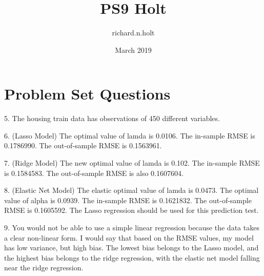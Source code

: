 \documentclass{article}
\title{PS9 Holt}
\author{richard.n.holt }
\date{March 2019}
\begin{document}
\maketitle

\section{Problem Set Questions}

5. The housing train data has observations of 450 different variables.

6. (Lasso Model) The optimal value of lamda is 0.0106. The in-sample RMSE is 0.1786990. The out-of-sample RMSE is 0.1563961.

7. (Ridge Model) The new optimal value of lamda is 0.102. The in-sample RMSE is 0.1584583. The out-of-sample RMSE is also 0.1607604.

8. (Elastic Net Model) The elastic optimal value of lamda is 0.0473. The optimal value of alpha is 0.0939. The in-sample RMSE is 0.1621832. The out-of-sample RMSE is 0.1605592. The Lasso regression should be used for this prediction test.

9. You would not be able to use a simple linear regression because the data takes a clear non-linear form. I would say that based on the RMSE values, my model has low variance, but high bias. The lowest bias belongs to the Lasso model, and the highest bias belongs to the ridge regression, with the elastic net model falling near the ridge regression.
\end{document}
